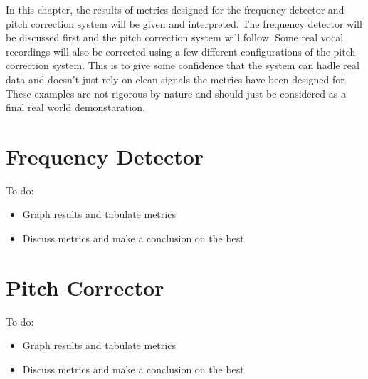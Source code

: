 
In this chapter, the results of metrics designed for the frequency detector and
pitch correction system will be given and interpreted. The frequency detector will
be discussed first and the pitch correction system will follow. Some real vocal
recordings will also be corrected using a few different configurations of the
pitch correction system. This is to give some confidence that the system can hadle
real data and doesn't just rely on clean signals the metrics have been designed
for. These examples are not rigorous by nature and should just be considered as a
final real world demonstaration.

\section{Frequency Detector}

\color{red}
To do:
\begin{itemize}
	\item Graph results and tabulate metrics
	\item Discuss metrics and make a conclusion on the best
\end{itemize}
\color{black}

\section{Pitch Corrector}

\color{red}
To do:
\begin{itemize}
	\item Graph results and tabulate metrics
	\item Discuss metrics and make a conclusion on the best
\end{itemize}
\color{black}
